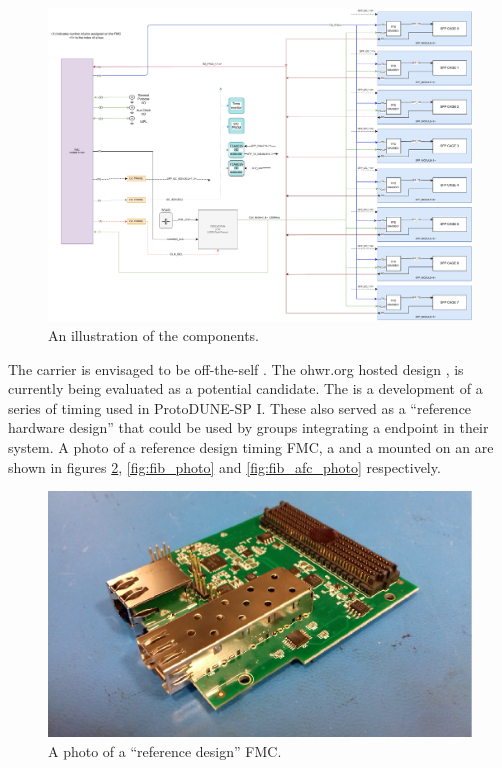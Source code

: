 \documentclass{dune}
\begin{document}
\begin{figure}[h]
\includegraphics[width=\textwidth]{dune_fib_v2_pc072a.drawio.pdf}
\caption{An illustration of the  components.}
\label{fig:fib_and_carrier_layout}
\end{figure}

The  carrier is envisaged to be off-the-self . The ohwr.org hosted  design \cite{amc_ohwr}, is currently being evaluated as a potential candidate. The  is a development of a series of timing  used in ProtoDUNE-SP I. These  also served as a ``reference hardware design'' that could be used by groups integrating a  endpoint in their system. A photo of a reference design timing FMC, a  and a  mounted on an  are shown in figures \ref{fig:timing_fmc}, \ref{fig:fib_photo} and \ref{fig:fib_afc_photo} respectively.

\begin{figure}[h]
\includegraphics[width=\textwidth]{timing_fmc.pdf}
\caption{A photo of a ``reference design'' FMC.}
\label{fig:timing_fmc}
\end{figure}
\end{document}
